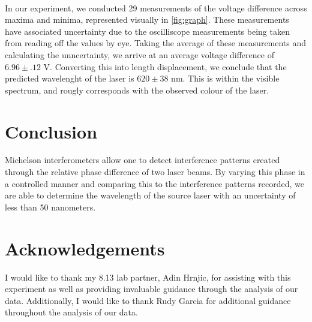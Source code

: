     \\
    In our experiment, we conducted 29 measurements of the voltage difference across maxima and minima, represented visually in \ref{fig:graph}. These measurements have associated uncertainty due to the oscilliscope measurements being taken from reading off the values by eye. Taking the average of these measurements and calculating the unncertainty, we arrive at an average voltage difference of $6.96 \pm .12 $ V. Converting this into length displacement, we conclude that the predicted wavelenght of the laser is $620 \pm 38$ nm. This is within the visible spectrum, and rougly corresponds with the observed colour of the laser.
    \section{Conclusion}
    Michelson interferometers allow one to detect interference patterns created through the relative phase difference of two laser beams. By varying this phase in a controlled manner and comparing this to the interference patterns recorded, we are able to determine the wavelength of the source laser with an uncertainty of less than 50 nanometers. 
    \section{Acknowledgements}
    I would like to thank my 8.13 lab partner, Adin Hrnjic, for assisting with this experiment as well as providing invaluable guidance through the analysis of our data. Additionally, I would like to thank Rudy Garcia for additional guidance throughout the analysis of our data.
    \lipsum


